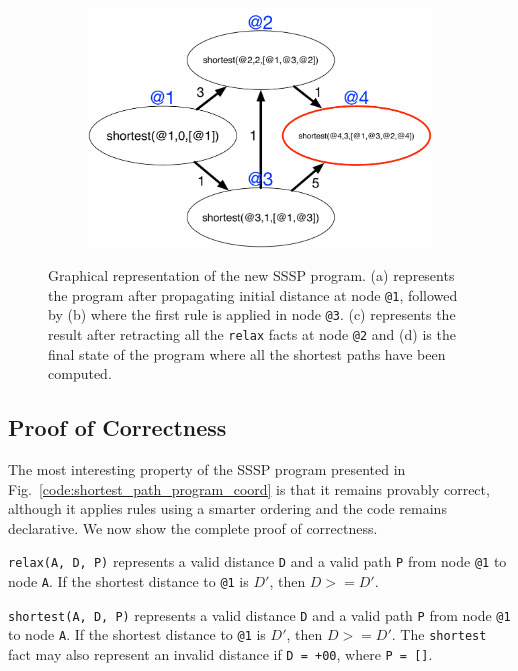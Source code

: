 \begin{figure}
\begin{center}
\begin{subfigure}[b]{0.4\textwidth}
      \caption{}
   \end{subfigure}
   \begin{subfigure}[b]{0.4\textwidth}
      \includegraphics[width=\textwidth]{figures/sssp/coord4}
      \caption{}
   \end{subfigure}
\end{center}
\caption{Graphical representation of the new SSSP program. (a) represents the
   program after propagating initial distance at node \texttt{@1}, followed by
   (b) where the first rule is applied in node \texttt{@3}. (c)
   represents the result after retracting all the \texttt{relax} facts at node
   \texttt{@2} and (d) is the final state of the program where all the shortest paths
   have been computed.}
\label{fig:coordination:new_sssp}
\end{figure}

\subsection{Proof of Correctness}

The most interesting property of the SSSP program presented in
Fig.~\ref{code:shortest_path_program_coord} is that it remains provably correct,
although it applies rules using a smarter ordering and the code remains
declarative. We now show the complete proof of correctness.

\begin{invariant}[Distance]

\texttt{relax(A, D, P)} represents a valid distance \texttt{D} and a valid path
\texttt{P} from node \texttt{@1} to node \texttt{A}. If the shortest distance to
\texttt{@1} is $D'$, then $D >= D'$.

\texttt{shortest(A, D, P)} represents a valid distance \texttt{D} and a valid
path \texttt{P} from node \texttt{@1} to node \texttt{A}. If the shortest
distance to \texttt{@1} is $D'$, then $D >= D'$. The \texttt{shortest} fact may
also represent an invalid distance if \texttt{D = +00}, where \texttt{P = []}.

\end{invariant}

